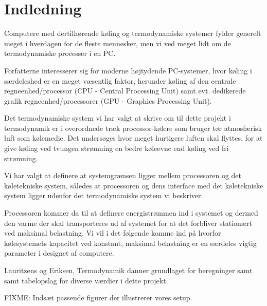 \section{Indledning}

Computere med dertilhørende køling og termodynamiske systemer fylder generelt meget i hverdagen for de fleste mennesker, men vi ved meget lidt om de termodynamiske processer i en PC.

Forfatterne interesserer sig for moderne højtydende PC-systemer, hvor køling i særdeleshed er en meget væsentlig faktor, herunder køling af den centrale regneenhed/processor (CPU - Central Processing Unit) samt evt. dedikerede grafik regneenhed/processorer (GPU - Graphics Processing Unit).

Det termodynamiske system vi har valgt at skrive om til dette projekt i termodynamik er i overordnede træk processor-kølere som bruger tør atmosfærisk luft som kølemedie. Det undersøges hvor meget hurtigere luften skal flyttes, for at give køling ved tvungen strømning en bedre køleevne end køling ved fri strømning.

Vi har valgt at definere at systemgrænsen ligger mellem processoren og det køletekniske system, således at processoren og dens interface med det køletekniske system ligger udenfor det termodynamiske system vi beskriver.

Processoren kommer da til at definere energistrømmen ind i systemet og dermed den varme der skal transporteres ud af systemet for at det forbliver stationært ved maksimal belastning. Vi vil i det følgende komme ind på hvorfor kølesystemets kapacitet ved konstant, maksimal belastning er en særdeles vigtig parameter i designet af computere.

Lauritzens og Eriksen, Termodynamik danner grundlaget for beregninger samt samt tabelopslag for diverse værdier i dette projekt.

FIXME:
Indsæt passende figurer der illustrerer vores setup.
